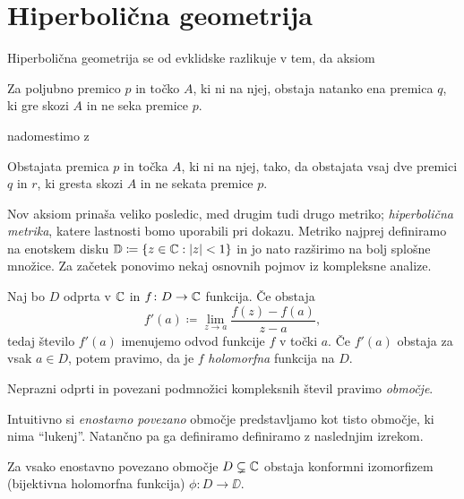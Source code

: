 \section{Hiperbolična geometrija} \label{sec:hipgeom}

\noindent Hiperbolična geometrija se od evklidske razlikuje v tem, da aksiom

\begin{aksiom}
    Za poljubno premico \(p\) in točko \(A\), ki ni na njej, obstaja natanko ena premica \(q\), ki gre skozi \(A\) in ne seka premice \(p\).
\end{aksiom}

\noindent nadomestimo z

\begin{aksiom}
    Obstajata premica \(p\) in točka \(A\), ki ni na njej, tako, da obstajata vsaj dve premici \(q\) in \(r\), ki gresta skozi \(A\) in ne sekata premice \(p\).
\end{aksiom}

\noindent Nov aksiom prinaša veliko posledic, med drugim tudi drugo metriko; \emph{hiperbolična metrika}, katere lastnosti bomo uporabili pri dokazu. Metriko najprej definiramo na enotskem disku \(\mathbb D \coloneq \left\{ z \in \mathbb C : |z| < 1 \right\}\) in jo nato razširimo na bolj splošne množice. Za začetek ponovimo nekaj osnovnih pojmov iz kompleksne analize.

\begin{definicija}
    Naj bo \(D\) odprta v \(\mathbb C\) in \(f \colon D \to \mathbb C\) funkcija. Če obstaja
    \[f' (a) \coloneq \lim_{z \to a} \frac{f (z) - f (a)}{z - a},\]
    tedaj število \(f' (a)\) imenujemo odvod funkcije \(f\) v točki \(a\).
    Če \(f' (a)\) obstaja za vsak \(a \in D\), potem pravimo, da je \(f\)
    \emph{holomorfna} funkcija na \(D\).
\end{definicija}

\begin{definicija}
    Neprazni odprti in povezani podmnožici kompleksnih števil pravimo \emph{območje}.
\end{definicija}

\noindent Intuitivno si \emph{enostavno povezano} območje predstavljamo kot tisto območje, ki nima ``lukenj''. Natančno pa ga definiramo definiramo z naslednjim izrekom.

\begin{izrek}
    Za vsako enostavno povezano območje \(D \subsetneq \mathbb C\) obstaja konformni
    izomorfizem (bijektivna holomorfna funkcija) \(\phi \colon D \to \DD\).
\end{izrek}

